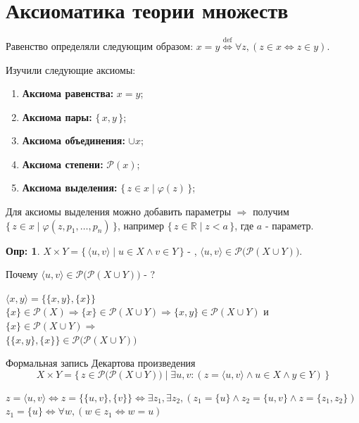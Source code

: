 \documentclass[12pt]{article}
\theoremstyle{definition}
\newtheorem{defn}{Опр:}
\begin{document}
	
\section*{Аксиоматика теории множеств}

Равенство определяли следующим образом: $x = y \overset{\text{def}}{\Leftrightarrow} \forall z, (z \in x \Leftrightarrow z \in y)$.

Изучили следующие аксиомы:
\begin{enumerate}[label={(\arabic*)}]
	\item \textbf{Аксиома равенства:} $x =y$;
	\item \textbf{Аксиома пары:} $\{\,x,y\,\}$;
	\item \textbf{Аксиома объединения:} $\cup x$;
	\item \textbf{Аксиома степени:} $\mathcal{P}(x)$;
	\item \textbf{Аксиома выделения:} $\{\,z \in x \mid \varphi(z)\,\}$;
\end{enumerate}
	
Для аксиомы выделения можно добавить параметры $\Rightarrow$ получим $\{\,z \in x \mid \varphi(z,p_1,\dotsc,p_n)\,\}$, например $\{\,z \in \mathbb{R} \mid z < a\,\}$, где $a$ - параметр.
	
\begin{defn}
	$X \times Y = \{\,\langle u,v\rangle \mid u \in X \wedge v \in Y \,\}$ - , $\langle u,v\rangle \in \mathcal{P}\big(\mathcal{P}(X \cup Y)\big)$.
\end{defn}
	
	
Почему $\langle u, v \rangle \in \mathcal{P}\big(\mathcal{P}(X \cup Y)\big)$ - ?
	
$\langle x,y \rangle = \big\{\{x,y\}, \{x\}\big\}$\\ 
$\{x\} \in \mathcal{P}(X) \Rightarrow \{x\} \in \mathcal{P}(X \cup Y) \Rightarrow \{x,y\} \in \mathcal{P}(X\cup Y)$ и $\{x\} \in \mathcal{P}(X\cup Y) \Rightarrow$\\ 
$\big\{\{x,y\}, \{x\} \big\} \in \mathcal{P}\big(\mathcal{P}(X\cup Y)\big)$
	
Формальная запись Декартова произведения $$X \times Y = \big\{\,z \in \mathcal{P}\big(\mathcal{P}(X\cup Y)\big) \mid \exists u, v \colon (z = \langle u, v \rangle \wedge u \in X \wedge y \in Y) \,\big\}$$

$z = \langle u, v \rangle \Leftrightarrow z = \big\{\{u,v\},\{v\} \big\} \Leftrightarrow \exists z_1, \exists z_2, (z_1 = \{u\} \wedge z_2 = \{u,v\} \wedge z = \{z_1, z_2\})$\\
$z_1 = \{u\} \Leftrightarrow \forall w, (w \in z_1 \Leftrightarrow w = u)$
\end{document}

